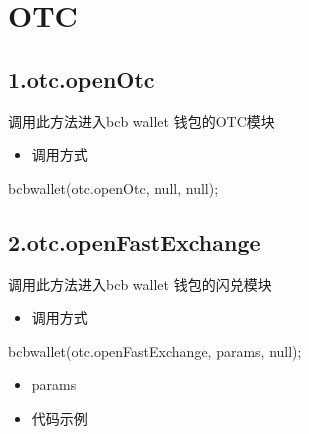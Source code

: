 \documentclass[letterpaper,10pt,english]{sphinxmanual}
\begin{document}
\section{OTC}
\label{\detokenize{jsapi:otc}}

\subsection{1.otc.openOtc}
\label{\detokenize{jsapi:otc-openotc}}
调用此方法进入bcb wallet 钱包的OTC模块
\begin{itemize}
\item {} 
调用方式

\end{itemize}

\begin{sphinxVerbatim}[commandchars=\\\{\}]
bcbwallet(\PYGZsq{}otc.openOtc\PYGZsq{}, null, null);
\end{sphinxVerbatim}


\subsection{2.otc.openFastExchange}
\label{\detokenize{jsapi:otc-openfastexchange}}
调用此方法进入bcb wallet 钱包的闪兑模块
\begin{itemize}
\item {} 
调用方式

\end{itemize}

\begin{sphinxVerbatim}[commandchars=\\\{\}]
bcbwallet(\PYGZsq{}otc.openFastExchange\PYGZsq{}, params, null);
\end{sphinxVerbatim}
\begin{itemize}
\item {} 
params

\end{itemize}

\begin{sphinxVerbatim}[commandchars=\\\{\}]
     
     
\end{sphinxVerbatim}
\begin{itemize}
\item {} 
代码示例

\end{itemize}
\end{document}
